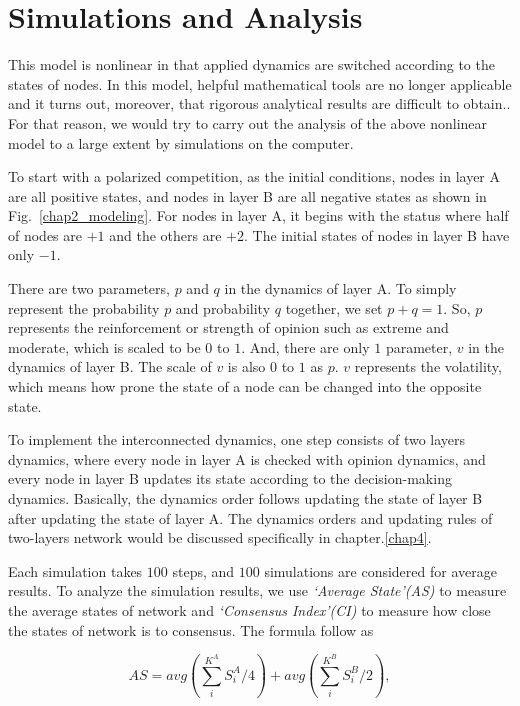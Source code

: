\section{Simulations and Analysis}
This model is nonlinear in that applied dynamics are switched according to the states of nodes. In this model, helpful mathematical tools are no longer applicable and  it turns out, moreover, that rigorous analytical results are difficult to obtain.\parencite{nicolas2017, rainer2002}. For that reason, we would try to carry out the analysis of the above nonlinear model to a large extent by simulations on the computer.

To start with a polarized competition, as the initial conditions,  nodes in layer A are all positive states, and nodes in layer B are all negative states as shown in Fig.~\ref{chap2_modeling}. For nodes in layer A, it begins with the status where half of nodes are $+1$ and the others are $+2$. The initial states of nodes in layer B have only $-1$.

There are two parameters, $p$ and $q$ in the dynamics of layer A. To simply represent the probability $p$ and probability $q$ together, we set $p+q=1$. So, $p$ represents the reinforcement or strength of opinion such as extreme and moderate, which is scaled to be $0$ to $1$. And, there are only $1$ parameter, $v$ in the dynamics of layer B. The scale of $v$ is also $0$ to $1$ as $p$. $v$ represents the volatility, which means how prone the state of a node can be changed into the opposite state.

To implement the interconnected dynamics, one step consists of two layers dynamics, where every node in layer A is checked with opinion dynamics, and every node in layer B updates its state according to the decision-making dynamics. Basically, the dynamics order follows updating the state of layer B after updating the state of layer A. The dynamics orders and updating rules of two-layers network would be discussed specifically in chapter.\ref{chap4}.     

Each simulation takes $100$ steps, and $100$ simulations are considered for average results. To analyze the simulation results, we use \textit{`Average State'(AS)} to measure the average states of network and \textit{`Consensus Index'(CI)} to measure how close the states of network is to consensus. The formula follow as

\begin{equation}
AS = avg\left( {\sum\limits_i^{{K^A}} {S_i^A/4} } \right) + avg\left( {\sum\limits_i^{{K^B}} {S_i^B/2} } \right),
\end{equation}

